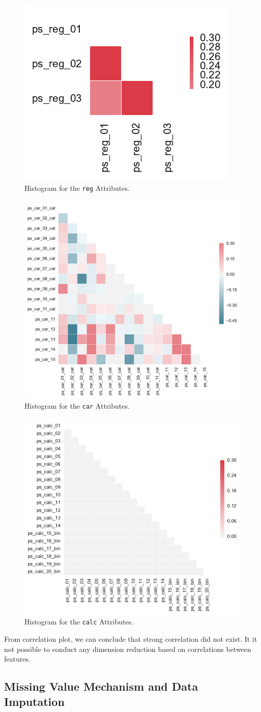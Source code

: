 \documentclass{standalone}
\begin{document}
\begin{figure}[!t]
\centering
\includegraphics[width=.2\textwidth]{fig/corr_reg_col.pdf}
\caption{Histogram for the \lstinline{reg} Attributes.}
\label{corr_reg}
\end{figure}

\begin{figure}[!t]
\centering
\includegraphics[width=.5\textwidth]{fig/corr_car_col.pdf}
\caption{Histogram for the \lstinline{car} Attributes.}
\label{corr_car}
\end{figure}

\begin{figure}[!t]
\centering
\includegraphics[width=.5\textwidth]{fig/corr_calc_col.pdf}
\caption{Histogram for the \lstinline{calc} Attributes.}
\label{corr_calc}
\end{figure}

From correlation plot, we can conclude that strong correlation did not exist.
It it not possible to conduct any dimension reduction based on correlations
between features.

\subsection{Missing Value Mechanism and Data Imputation}
\end{document}
